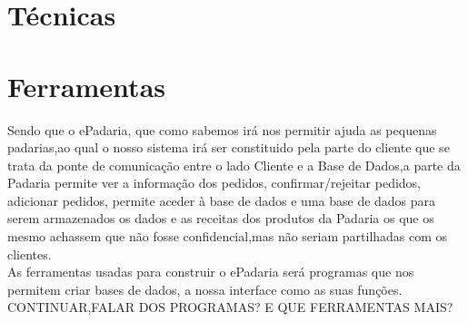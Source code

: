 \section{Técnicas}

\section{Ferramentas}
Sendo que o ePadaria, que como sabemos irá nos permitir ajuda as pequenas padarias,ao qual o nosso sistema irá ser constituido pela parte do cliente que se trata da ponte de comunicação entre o lado Cliente e a Base de Dados,a parte da Padaria permite ver a informação dos pedidos, confirmar/rejeitar pedidos, adicionar pedidos, permite aceder à base de dados e uma base de dados para serem armazenados os dados e as receitas dos produtos da Padaria os que os mesmo achassem que não fosse confidencial,mas não seriam partilhadas com os clientes.\\
As ferramentas usadas para construir o ePadaria será programas que nos permitem criar bases de dados, a nossa interface como as suas funções. 
CONTINUAR,FALAR DOS PROGRAMAS? E QUE FERRAMENTAS MAIS?
